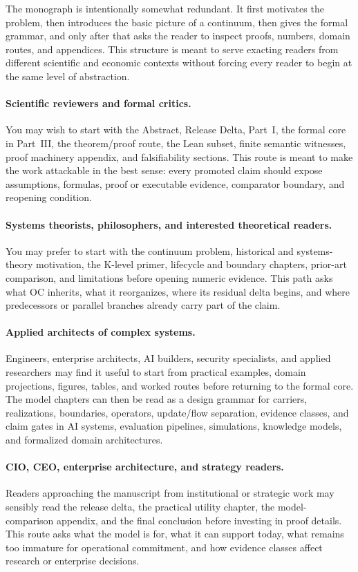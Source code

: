 The monograph is intentionally somewhat redundant. It first motivates the
problem, then introduces the basic picture of a continuum, then gives the
formal grammar, and only after that asks the reader to inspect proofs, numbers,
domain routes, and appendices. This structure is meant to serve exacting
readers from different scientific and economic contexts without forcing every
reader to begin at the same level of abstraction.

\paragraph{Scientific reviewers and formal critics.}
You may wish to start with the Abstract, Release Delta, Part~I, the formal core
in Part~III, the theorem/proof route, the Lean subset, finite semantic
witnesses, proof machinery appendix, and falsifiability sections. This route is
meant to make the work attackable in the best sense: every promoted claim
should expose assumptions, formulas, proof or executable evidence, comparator
boundary, and reopening condition.

\paragraph{Systems theorists, philosophers, and interested theoretical readers.}
You may prefer to start with the continuum problem, historical and systems-
theory motivation, the K-level primer, lifecycle and boundary chapters,
prior-art comparison, and limitations before opening numeric evidence. This
path asks what OC inherits, what it reorganizes, where its residual delta
begins, and where predecessors or parallel branches already carry part of the
claim.

\paragraph{Applied architects of complex systems.}
Engineers, enterprise architects, AI builders, security specialists, and
applied researchers may find it useful to start from practical examples,
domain projections, figures, tables, and worked routes before returning to the
formal core. The model chapters can then be read as a design grammar for
carriers, realizations, boundaries, operators, update/flow separation, evidence
classes, and claim gates in AI systems, evaluation pipelines, simulations,
knowledge models, and formalized domain architectures.

\paragraph{CIO, CEO, enterprise architecture, and strategy readers.}
Readers approaching the manuscript from institutional or strategic work may
sensibly read the release delta, the practical utility chapter, the
model-comparison appendix, and the final conclusion before investing in proof
details. This route asks what the model is for, what it can support today, what
remains too immature for operational commitment, and how evidence classes
affect research or enterprise decisions.

